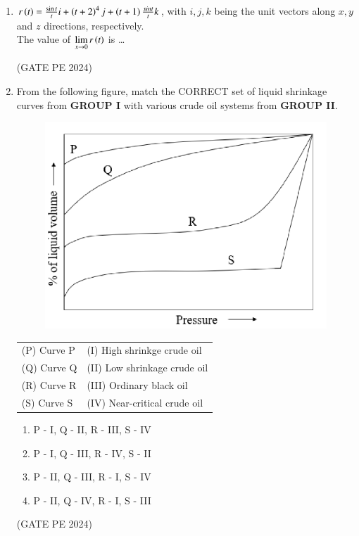 \documentclass[journal,12pt,onecolumn]{IEEEtran}
\theoremstyle{remark}
\begin{document}
\begin{enumerate}
\item $r\left(t\right)=\frac{\sin t}{t}i+\left(t+2\right)^4j+\left(t+1\right)\frac{sint}{t}k$, with $i,j,k$ being the unit vectors along $x,y$ and $z$ directions, respectively.\\
The value of $\lim\limits_{x \to 0}r\left(t\right)$ is \dots
\begin{enumerate}
\end{enumerate}
\hfill{(GATE PE 2024)}

\item From the following figure, match the CORRECT set of liquid shrinkage curves from \textbf{GROUP I} with various crude oil systems from \textbf{GROUP II}.
\begin{figure}[H]
    \centering
    \includegraphics[width=0.5\columnwidth]{LQ_38.png}
    \caption{}
    \label{fig:placeholder}
\end{figure}
\begin{tabular}{ll}
(P) Curve P& (I) High shrinkge crude oil\\
(Q) Curve Q& (II) Low shrinkage crude oil\\
(R) Curve R & (III) Ordinary black oil \\
(S) Curve S & (IV) Near-critical crude oil \\
\end{tabular}
\begin{enumerate}
    \item P - I, Q - II, R - III, S - IV 
    \item P - I, Q - III, R - IV, S - II 
    \item P - II, Q - III, R - I, S - IV 
    \item P - II, Q - IV, R - I, S - III
\end{enumerate}
\hfill{(GATE PE 2024)}


\end{enumerate}
\end{document}
